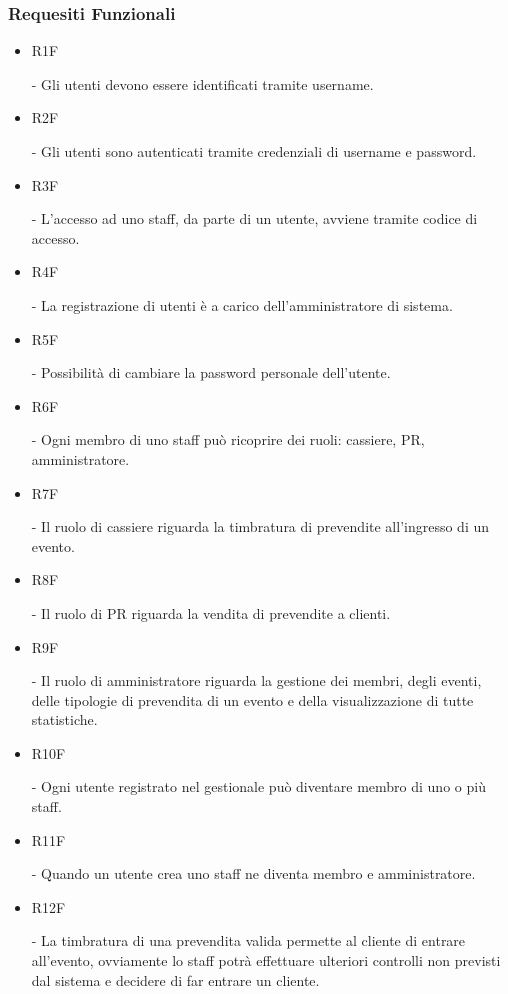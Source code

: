\documentclass[a4paper]{article}
\begin{document}
\subsubsection{Requesiti Funzionali}

\begin{itemize}
	
	\item \hypertarget{R1F}{R1F} - Gli utenti devono essere identificati tramite username.
	
	\item \hypertarget{R2F}{R2F} - Gli utenti sono autenticati tramite credenziali di username e password.
	\item \hypertarget{R3F}{R3F} - L'accesso ad uno staff, da parte di un utente, avviene tramite codice di accesso.	

	\item \hypertarget{R4F}{R4F} - La registrazione di utenti è a carico dell'amministratore di sistema.
	\item \hypertarget{R5F}{R5F} - Possibilità di cambiare la password personale dell'utente.
		
	\item \hypertarget{R6F}{R6F} - Ogni membro di uno staff può ricoprire dei ruoli: cassiere, PR, amministratore.	
	\item \hypertarget{R7F}{R7F} - Il ruolo di cassiere riguarda la timbratura di prevendite all'ingresso di un evento.
	\item \hypertarget{R8F}{R8F} - Il ruolo di PR riguarda la vendita di prevendite a clienti.
	\item \hypertarget{R9F}{R9F} - Il ruolo di amministratore riguarda la gestione dei membri, degli eventi, delle tipologie di prevendita di un evento e della visualizzazione di tutte statistiche.
	
	\item \hypertarget{R10F}{R10F} - Ogni utente registrato nel gestionale può diventare membro di uno o più staff. 
	
	\item \hypertarget{R11F}{R11F} - Quando un utente crea uno staff ne diventa membro e amministratore.
	
	\item \hypertarget{R12F}{R12F} - La timbratura di una prevendita valida permette al cliente di entrare all'evento, ovviamente lo staff potrà effettuare ulteriori controlli non previsti dal sistema e decidere di far entrare un cliente.
	

\end{itemize}
\end{document}
